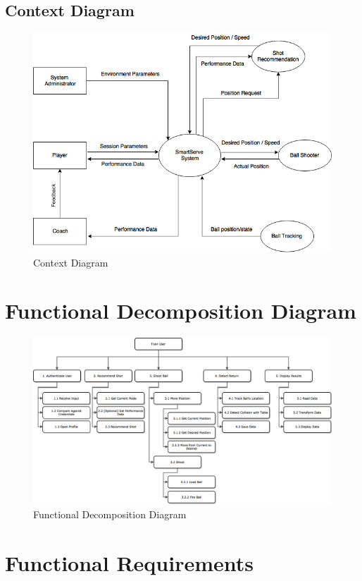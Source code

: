 \documentclass[11pt]{article}
\begin{document}
\subsection{Context Diagram}
\begin{figure}[H]
   \centering
   \includegraphics[width=\textwidth]{diagrams/ContextDiagram.png}
   \caption{Context Diagram}
   \label{fig:ContextDiagram}
\end{figure}


\section{Functional Decomposition Diagram}
\begin{figure}[H]
   \centering
   \includegraphics[width=\textwidth]{diagrams/FDD.png}
   \caption{Functional Decomposition Diagram}
   \label{fig:fdd}
\end{figure}

\section{Functional Requirements}
\end{document}
